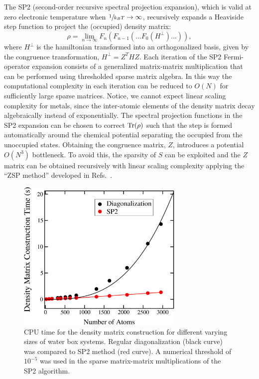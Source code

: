 \documentclass{revtex4-1}
\begin{document}
The SP2 (second-order recursive spectral projection
expansion),\cite{ANiklasson02} which is valid at zero electronic temperature
when $\sfrac{1}{k_BT} \rightarrow \infty$, recursively expands a Heaviside step function
to project the (occupied) density matrix:
\begin{equation}
  \rho = \lim_{n \rightarrow \infty} F_n(F_{n-1}(\ldots F_0(H^\perp)\ldots )),
\end{equation}
where $H^\perp$ is the hamiltonian transformed into an orthogonalized basis,
given by the congruence transformation, $H^\perp = Z^T HZ$. Each iteration of
the SP2 Fermi-operator expansion consists of a generalized matrix-matrix
multiplication that can be performed using thresholded sparse matrix algebra. In
this way the computational complexity in each iteration can be reduced to $O(N)$
for sufficiently large sparse matrices. Notice, we cannot expect linear scaling
complexity for metals, since the inter-atomic elements of the density matrix
decay algebraically instead of exponentially.\cite{SGoedecker99} The spectral
projection functions in the SP2 expansion can be chosen to correct $\operatorname{Tr} (\rho)$
such that the step is formed automatically around the chemical potential
separating the occupied from the unoccupied states.\cite{ANiklasson02} Obtaining
the congruence matrix, $Z$, introduces a potential $O(N^3)$
bottleneck. To avoid this, the sparsity of $S$ can be exploited and the $Z$
matrix can be obtained recursively with linear scaling complexity applying the
``ZSP method'' developed in Refs.~.
\begin{figure}[htbp]
  \centering
  \includegraphics[width=8cm]{./figures/dftb-ordern1.pdf}
  \caption{CPU time for the density matrix construction for different varying
    sizes of water box systems. Regular diagonalization (black curve) was
    compared to SP2 method (red curve). A numerical threshold of $10^{-5}$ was
    used in the sparse matrix-matrix multiplications of the SP2 algorithm.}
  \label{fig:SP2}
\end{figure}
\end{document}
